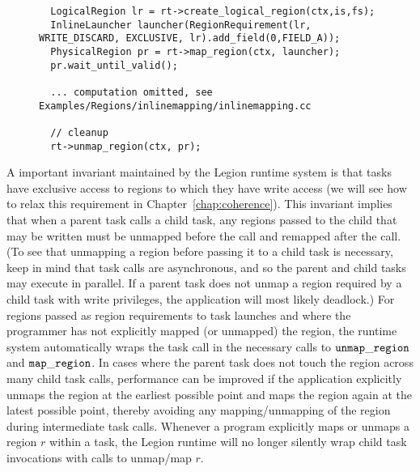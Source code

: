 \begin{figure}
{\small
\begin{lstlisting}
  LogicalRegion lr = rt->create_logical_region(ctx,is,fs);
  InlineLauncher launcher(RegionRequirement(lr, WRITE_DISCARD, EXCLUSIVE, lr).add_field(0,FIELD_A));
  PhysicalRegion pr = rt->map_region(ctx, launcher);
  pr.wait_until_valid();

  ... computation omitted, see Examples/Regions/inlinemapping/inlinemapping.cc

  // cleanup
  rt->unmap_region(ctx, pr);
\end{lstlisting}
}
\caption{}
\label{fig:inlinelaunch}
\end{figure}

A important invariant maintained by the Legion runtime system is that
tasks have exclusive access to regions to which they have write access
(we will see how to relax this requirement in
Chapter~\ref{chap:coherence}).  This invariant implies that when a
parent task calls a child task, any regions passed to the child that
may be written must be unmapped before the call and remapped after the
call.  (To see that unmapping a region before passing it to a child
task is necessary, keep in mind that task calls are asynchronous, and
so the parent and child tasks may execute in parallel.  If a
parent task does not unmap a region required by a child task with
write privileges, the application will most likely deadlock.)  For
regions passed as region requirements to task launches and where the
programmer has not explicitly mapped (or unmapped) the region, the
runtime system automatically wraps the task call in the necessary
calls to $\tt unmap\_region$ and $\tt map\_region$.  In cases where
the parent task does not touch the region across many child task
calls, performance can be improved if the application explicitly
unmaps the region at the earliest possible point and maps the region
again at the latest possible point, thereby avoiding any
mapping/unmapping of the region during intermediate task calls.
Whenever a program explicitly maps or unmaps a region $r$ within a
task, the Legion runtime will no longer silently wrap child task
invocations with calls to unmap/map $r$.
